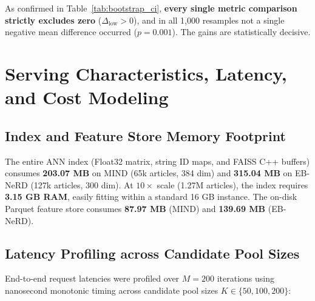 \documentclass[11pt,a4paper]{article}
\begin{document}
\noindent As confirmed in Table~\ref{tab:bootstrap_ci}, \textbf{every single metric comparison strictly excludes zero} ($\Delta_{\text{low}} > 0$), and in all 1,000 resamples not a single negative mean difference occurred ($p = 0.001$). The gains are statistically decisive.

\section{Serving Characteristics, Latency, and Cost Modeling}

\subsection{Index and Feature Store Memory Footprint}
The entire ANN index (Float32 matrix, string ID maps, and FAISS C++ buffers) consumes \textbf{203.07 MB} on MIND (65k articles, 384 dim) and \textbf{315.04 MB} on EB-NeRD (127k articles, 300 dim). At $10\times$ scale (1.27M articles), the index requires \textbf{3.15 GB RAM}, easily fitting within a standard 16 GB instance. The on-disk Parquet feature store consumes \textbf{87.97 MB} (MIND) and \textbf{139.69 MB} (EB-NeRD).

\subsection{Latency Profiling across Candidate Pool Sizes}
End-to-end request latencies were profiled over $M = 200$ iterations using nanosecond monotonic timing across candidate pool sizes $K \in \{50, 100, 200\}$:

\begin{table}[t]
\centering
\small
{}
\caption{Latency Breakdown (ms) across Candidate Pool Sizes against SLA ($p99 < 100\text{ ms}$).}
\label{tab:latency}
\end{table}
\end{document}
